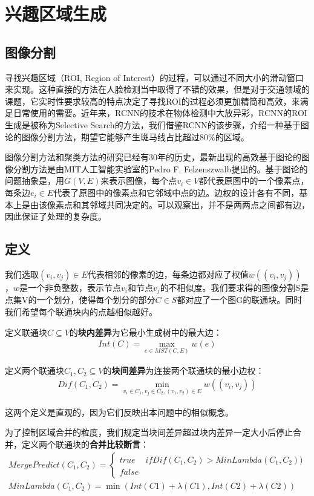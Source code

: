 \chapter{兴趣区域生成}
\label{cha:roi}
\section{图像分割}
寻找兴趣区域（ROI, Region of Interest）的过程，可以通过不同大小的滑动窗口来实现。这种直接的方法在人脸检测当中取得了不错的效果，但是对于交通领域的课题，它实时性要求较高的特点决定了寻找ROI的过程必须更加精简和高效，来满足日常使用的需要。近年来，RCNN的技术在物体检测中大放异彩，RCNN的ROI生成是被称为Selective Search的方法，我们借鉴RCNN的该步骤，介绍一种基于图论的图像分割方法，期望它能够产生斑马线占比超过$80\%$的区域。 \par
图像分割方法和聚类方法的研究已经有30年的历史，最新出现的高效基于图论的图像分割方法是由MIT人工智能实验室的Pedro F. Felzenszwalb提出的。基于图论的问题抽象是，用$G(V,E)$来表示图像，每个点$v_i\in V$都代表原图中的一个像素点，每条边$e_i\in E$代表了原图中的像素点和它邻域中点的边。边权的设计各有不同，基本上是由该像素点和其邻域共同决定的。可以观察出，并不是两两点之间都有边，因此保证了处理的复杂度。
\section{定义}
我们选取$(v_i, v_j)\in E$代表相邻的像素的边，每条边都对应了权值$w((v_i, v_j))$，$w$是一个非负整数，表示节点$v_i$和节点$v_j$的不相似度。我们要求得的图像分割S是点集V的一个划分，使得每个划分的部分$C\in S$都对应了一个图G的联通块。同时我们希望每个联通块内的点越相似越好。\par
定义联通块$C\subseteq V$的\textbf{块内差异}为它最小生成树中的最大边：
\begin{align}
    Int(C)=\max_{e\in MST(C,E)}w(e)
\end{align}\par
定义两个联通块$C_1,C_2\subseteq V$的\textbf{块间差异}为连接两个联通块的最小边权：
\begin{align}
Dif(C_1,C_2)=\min_{v_i\in C_1,v_j\in C_2,(v_1,v_2)\in E}w((v_i, v_j))
\end{align}\par
这两个定义是直观的，因为它们反映出本问题中的相似概念。\par
为了控制区域合并的粒度，我们规定当块间差异超过块内差异一定大小后停止合并，定义两个联通块的\textbf{合并比较断言}：
\begin{align}
MergePredict(C_1, C_2)=\left\{\begin{matrix}
    true & if Dif(C_1, C_2) > MinLambda(C_1, C_2))\\ 
    false & 
    \end{matrix}\right.\\ 
MinLambda(C_1, C_2) = \min(Int(C1) + \lambda(C1), Int(C2) + \lambda(C2))
\end{align}

